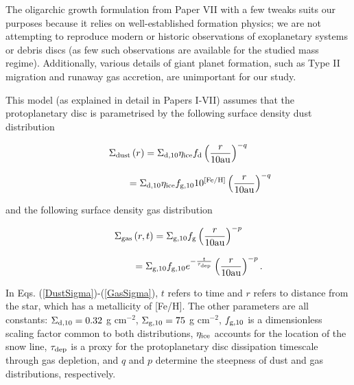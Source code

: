 \documentclass[useAMS,usenatbib]{mn2e}
\begin{document}
The oligarchic growth formulation from Paper VII \citep{idaetal2013} with a few tweaks suits our purposes because it relies on well-established formation physics; we are not attempting to reproduce modern or historic observations of exoplanetary systems or debris discs (as few such observations are available for the studied mass regime). Additionally, various details of giant planet formation, such as Type II migration and runaway gas accretion, are unimportant for our study.

This model (as explained in detail in Papers I-VII) assumes that the protoplanetary disc is parametrised by the following surface density dust distribution 


\[
\Sigma_{\rm dust}\left(r\right)
=
\Sigma_{\rm d,10}\eta_{\rm ice}f_{\rm d}
       \left( \frac{r}{10 {\rm au}} \right)^{-q}
\]


\begin{equation}
\ \ \ \ \ \ \ \ \ \ \ \ \ \ 
=\Sigma_{\rm d,10}\eta_{\rm ice}f_{\rm g,10} 10^{\left[{\rm Fe/H}\right]}
       \left( \frac{r}{10 {\rm au}} \right)^{-q}
       \label{DustSigma}
\end{equation}

\noindent{}and the following surface density gas distribution

\[
\Sigma_{\rm gas}\left(r,t\right)
=
\Sigma_{\rm g,10}f_{\rm g}
       \left( \frac{r}{10 {\rm au}} \right)^{-p}
\]

\begin{equation}
\ \ \ \ \ \ \ \ \ \ \ \ \ 
=\Sigma_{\rm g,10}f_{\rm g,10} e^{-\frac{t}{\tau_{\rm dep}}}
       \left( \frac{r}{10 {\rm au}} \right)^{-p}.
       \label{GasSigma}
\end{equation}

\noindent{}In Eqs. (\ref{DustSigma})-(\ref{GasSigma}), $t$ refers to time and $r$ refers to distance from the star, which has a metallicity of [Fe/H]. The other parameters are all constants: $\Sigma_{\rm d,10}=0.32$ g cm$^{-2}$, $\Sigma_{\rm g,10}=75$ g cm$^{-2}$, $f_{\rm g,10}$ is a dimensionless scaling factor common to both distributions, $\eta_{\rm ice}$ accounts for the location of the snow line, $\tau_{\rm dep}$ is a proxy for the protoplanetary disc dissipation timescale through gas depletion, and $q$ and $p$ determine the steepness of dust and gas distributions, respectively.
\end{document}
